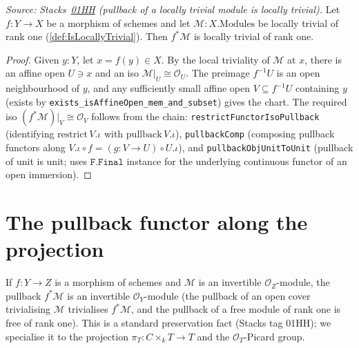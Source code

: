 \begin{lemma}

  \label{lem:IsLocallyTrivial_pullback}
  \textit{Source: Stacks~\href{https://stacks.math.columbia.edu/tag/01HH}{01HH}
  (pullback of a locally trivial module is locally trivial).}
  Let \(f : Y \to X\) be a morphism of schemes and let
  \(\mathcal{M} : X.\mathrm{Modules}\) be locally trivial of rank one
  (\cref{def:IsLocallyTrivial}). Then \(f^*\mathcal{M}\) is locally
  trivial of rank one.
\end{lemma}
\begin{proof}
  \leanok
  Given \(y : Y\), let \(x = f(y) \in X\). By the local triviality of
  \(\mathcal{M}\) at \(x\), there is an affine open \(U \ni x\) and an
  iso \(\mathcal{M}|_U \cong \mathcal{O}_U\). The preimage \(f^{-1}U\)
  is an open neighbourhood of \(y\), and any sufficiently small affine
  open \(V \subseteq f^{-1}U\) containing \(y\) (exists by
  \texttt{exists\_isAffineOpen\_mem\_and\_subset}) gives the chart. The
  required iso
  \((f^*\mathcal{M})|_V \cong \mathcal{O}_V\) follows from the chain:
  \texttt{restrictFunctorIsoPullback} (identifying \(\mathrm{restrict}\, V.\iota\)
  with \(\mathrm{pullback}\, V.\iota\)), \texttt{pullbackComp} (composing
  pullback functors along \(V.\iota \circ f = (g : V \to U) \circ U.\iota\)),
  and \texttt{pullbackObjUnitToUnit} (pullback of unit is unit; uses
  \(\mathtt{F.Final}\) instance for the underlying continuous functor of an
  open immersion).

\end{proof}

\section{The pullback functor along the projection}
\label{sec:lbp_pullback_projection}

If \(f : Y \to Z\) is a morphism of schemes and \(\mathcal{M}\) is an invertible
\(\mathcal{O}_Z\)-module, the pullback \(f^*\mathcal{M}\) is an invertible
\(\mathcal{O}_Y\)-module (the pullback of an open cover trivialising \(\mathcal{M}\)
trivialises \(f^*\mathcal{M}\), and the pullback of a free module of rank one is
free of rank one). This is a standard preservation fact (Stacks tag 01HH); we
specialise it to the projection \(\pi_T : C \times_k T \to T\) and the
\(\mathcal{O}_T\)-Picard group.

